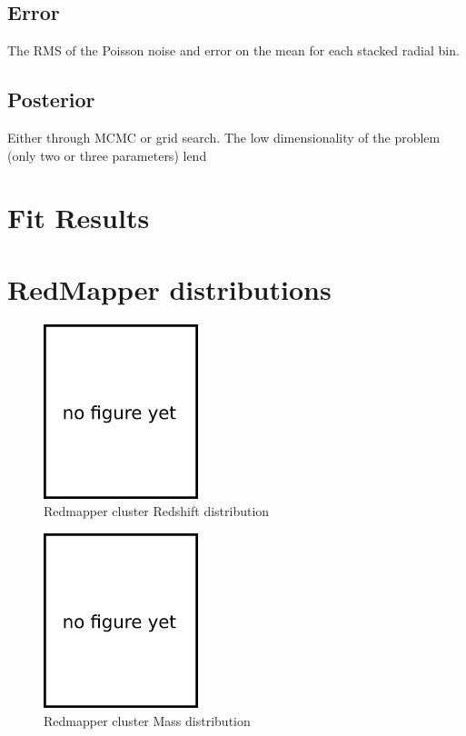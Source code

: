 \documentclass[twocolumn]{article}
\begin{document}
\subsection{Error}
The RMS of the Poisson noise and error on the mean for each stacked radial bin.

\subsection{Posterior}
Either through MCMC or grid search. The low dimensionality of the
problem (only two or three parameters) lend 

\section{Fit Results}

\clearpage
\appendix


\onecolumn
\section{RedMapper distributions}

\begin{figure}[H]
  \center\includegraphics[width=0.4\textwidth]{figs/404.png}
  \caption{Redmapper cluster Redshift distribution}
  \label{fig:redmapper_redshift}
\end{figure}


\begin{figure}[H]
  \center\includegraphics[width=0.4\textwidth]{figs/404.png}
  \caption{Redmapper cluster Mass distribution}
  \label{fig:redmapper_mass}
\end{figure}
\end{document}
